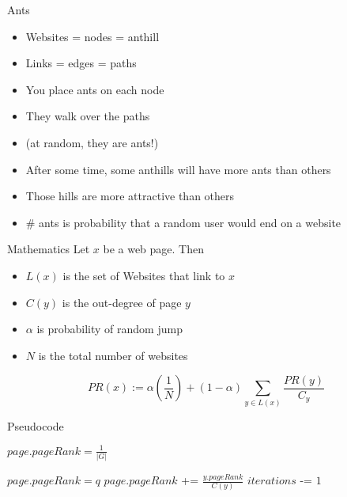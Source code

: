 \begin{frame}{Ants}
    \begin{itemize}[<+->]
        \item Websites = nodes = anthill
        \item Links = edges = paths
        \item You place ants on each node
        \item They walk over the paths
        \item[] (at random, they are ants!)
        \item After some time, some anthills will have more ants than
              others
        \item Those hills are more attractive than others
        \item \# ants is probability that a random user would end on
              a website
    \end{itemize}
\end{frame}

\begin{frame}{Mathematics}
    Let $x$ be a web page. Then
    \begin{itemize}
        \item $L(x)$ is the set of Websites that link to $x$
        \item $C(y)$ is the out-degree of page $y$
        \item $\alpha$ is probability of random jump
        \item $N$ is the total number of websites
    \end{itemize}

    \[\displaystyle PR(x) := \alpha \left ( \frac{1}{N} \right ) + (1-\alpha) \sum_{y\in L(x)} \frac{PR(y)}{C_{y}}\]
\end{frame}

\begin{frame}{Pseudocode}
        \begin{algorithmic}
                 
                     \State $page.pageRank = \frac{1}{|G|}$ 
                 \EndFor

                 
                      
                         \State $page.pageRank = q$
                         
                             \State $page.pageRank$ += $\frac{y.pageRank}{C(y)}$
                         \EndFor
{}                     \EndFor
{}                     \State $iterations$ -= $1$
                 \EndWhile
{}             \EndFunction
        \end{algorithmic}
\end{frame}
